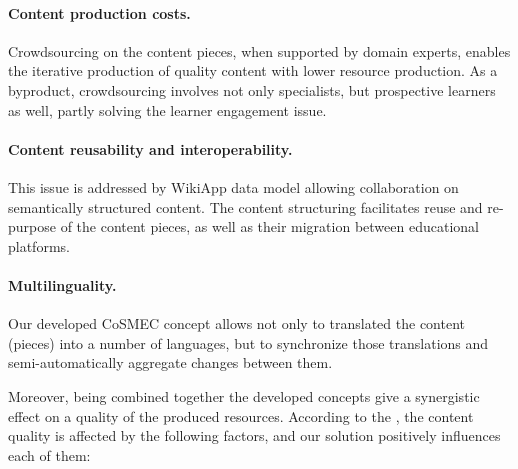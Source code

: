 \documentclass[ngerman,UKenglish,table]{scrbook}
\begin{document}
\paragraph{Content production costs.} Crowdsourcing on the content pieces, when supported by domain experts, enables the iterative production of quality content with lower resource production. 
As a byproduct, crowdsourcing involves not only specialists, but prospective learners as well, partly solving the learner engagement issue.
\paragraph{Content reusability and interoperability.} This issue is addressed by WikiApp data model allowing collaboration on semantically structured content. 
The content structuring facilitates reuse and re-purpose of the content pieces, as well as their migration between educational platforms.
\paragraph{Multilinguality.} Our developed CoSMEC concept allows not only to translated the content (pieces) into a number of languages, but to synchronize those translations and semi-automatically aggregate changes between them. 

Moreover, being combined together the developed concepts give a synergistic effect on a quality of the produced resources.
According to the \cite{sahar_vahdati_2015_14756}, the content quality is affected by the following factors, and our solution positively influences each of them:
\end{document}
